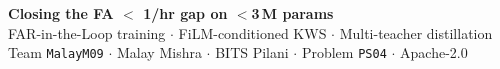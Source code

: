 \documentclass[aspectratio=169,10pt]{beamer}
\begin{document}
\begin{frame}[standout]
  \centering
  \textbf{Closing the FA $<$ 1/hr gap on $<$3\,M params}\\[0.5em]
  \normalsize FAR-in-the-Loop training  $\cdot$  FiLM-conditioned KWS  $\cdot$  Multi-teacher distillation\\[1em]
  \small\color{srigray}Team \texttt{MalayM09}  $\cdot$  Malay Mishra  $\cdot$  BITS Pilani  $\cdot$  Problem \texttt{PS04}  $\cdot$  Apache-2.0
\end{frame}
\end{document}
